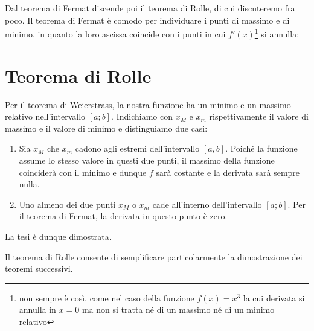 \documentclass{report}
\begin{document}
\par\smallskip\noindent Dal teorema di Fermat discende poi il teorema di Rolle, di cui discuteremo fra poco. Il teorema di Fermat è comodo per individuare i punti di massimo e di minimo, in quanto la loro ascissa coincide con i punti in cui $f'(x)$\footnote{non sempre è così, come nel caso della funzione $f(x)=x^3$ la cui derivata si annulla in $x=0$ ma non si tratta né di un massimo né di un minimo relativo} si annulla:
\section{Teorema di Rolle}
\begin{myproof}
Per il teorema di Weierstrass, la nostra funzione ha un minimo e un massimo relativo nell'intervallo $[a;b]$. Indichiamo con $x_M$ e $x_m$ rispettivamente il valore di massimo e il valore di minimo e distinguiamo due casi:
\begin{enumerate}[label=\protect\circled{\arabic*}]
	\item Sia $x_M$ che $x_m$ cadono agli estremi dell'intervallo $[a,b]$. Poiché la 				funzione assume lo stesso valore in questi due punti, il massimo della funzione 				coinciderà con il minimo e dunque $f$ sarà costante e la derivata sarà sempre nulla.
	\item Uno almeno dei due punti $x_M$ o $x_m$ cade all'interno dell'intervallo $[a;b]$. 	Per il teorema di Fermat, la derivata in questo punto è zero.
\end{enumerate}
La tesi è dunque dimostrata.
\end{myproof}
\par\smallskip\noindent Il teorema di Rolle consente di semplificare particolarmente la dimostrazione dei teoremi successivi.
\end{document}
